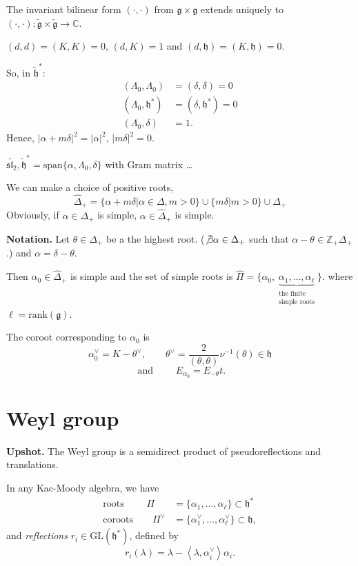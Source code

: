 \medskip\noindent
The invariant bilinear form $(\cdot,\cdot)$
from $\mathfrak{g} \times
\mathfrak{g}$ extends uniquely to
$(\cdot,\cdot):\tilde{\mathfrak{g}}
\times\tilde{\mathfrak{g}}\to
\mathbb{C}$.

$(d,d)=(K,K)=0$, $(d,K)=1$ and
$(d,\mathfrak{h})=(K,\mathfrak{h})=0$.

\medskip\noindent
So, in $\tilde{\mathfrak{h}}^*$:
$$
\begin{aligned}
(\Lambda_0,\Lambda_0)&=(\delta,\delta)=0\\
(\Lambda_0,\mathfrak{h}^*)&=(\delta,
\mathfrak{h}^*)=0\\
(\Lambda_0,\delta)&=1.
\end{aligned}
$$
Hence, $|\alpha+m \delta|^2=|\alpha|^2$, $|m
\delta|^2=0$.

\begin{example}
\label{example-sl2hat}
$\widetilde{\mathfrak{sl}_2},
\tilde{\mathfrak{h}}^*
=\text{span}\{\alpha,\Lambda_0,\delta\}$ with
Gram matrix …
\end{example}

We can make a choice of positive roots,
$$
\hat{\Delta}_+=\{\alpha+m \delta |\alpha \in
\Delta, m>0\}
\cup \{m \delta|m>0\} \cup \Delta_+
$$
Obviously, if $\alpha \in \Delta_+$ is
simple,
$\alpha \in \hat{\Delta}_+$ is simple.

\medskip\noindent
{\bf Notation.} Let $\theta \in \Delta_+$ be
a the highest root. ($\not \exists
\alpha \in \Delta_+$ such that $\alpha-\theta
\in \mathbb{Z}_+ \Delta_+$.) and
 $\alpha=\delta-\theta$.

Then $\alpha_0 \in \hat{\Delta}_+$ is simple
and the set of simple roots is
$\hat{\Pi}=\{\alpha_0,\underbrace{\alpha_1,
\ldots,\alpha_\ell}
_{\substack{\text{the finite} \\ \text{simple
roots}}} \}.$
where $\ell=\text{rank}(\mathfrak{g})$.

The coroot corresponding to $\alpha_0$ is
$$
\alpha^\vee_0=K-\theta^\vee, \qquad
\theta^\vee=\frac{2}{(\theta,\theta)}\nu^{-1}
(\theta)
\in \mathfrak{h}
$$
$$
\text{ and }\qquad E_{\alpha_0}=E_{-\theta}t.
$$

\section{Weyl group}
\label{section-Weyl-group}

\medskip\noindent
{\bf Upshot.} The Weyl group is a semidirect
product of
pseudoreflections and translations.

\medskip\noindent
In any Kac-Moody algebra, we have
$$
\begin{aligned}
\text{roots }\qquad
\Pi&=\{\alpha_1,\ldots,\alpha_\ell\}
\subset\mathfrak{h}^*
\\
\text{coroots}\qquad
\Pi^\vee&=\{\alpha_1^\vee,\ldots,
\alpha_\ell^\vee\}\subset
\mathfrak{h},
\end{aligned}
$$
and {\it reflections} $r_i \in
\text{GL}(\mathfrak{h}^*)$,
defined by
$$
r_i(\lambda)=\lambda-\left\langle{}\lambda,
\alpha_i^\vee\right\rangle{}\alpha_i.
$$


